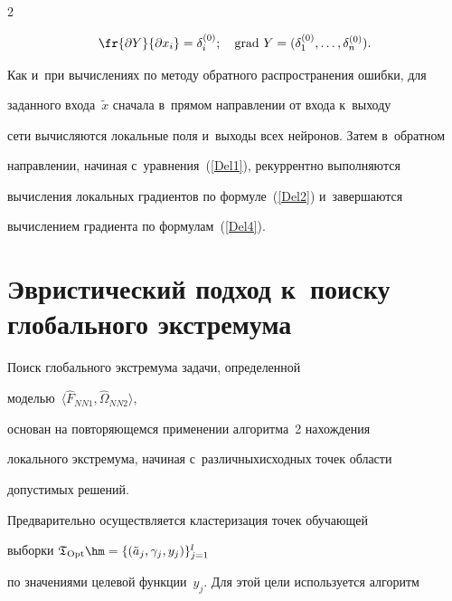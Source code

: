\begin{multicols}{2}
\noindent


\begin{equation}


\fr{\partial Y} {\partial x_i}=\delta_i^{(0)}; \quad 


\mathrm{grad} \ Y = (\delta_1^{(0)},\dots, \delta_n^{(0)}).


\label{Del4}


\end{equation}





Как и~при вычислениях по методу обратного распространения ошибки, для 


заданного входа~$\tilde{x}$ сначала в~прямом направлении от входа к~выходу 


сети вычисляются локальные поля и~выходы всех нейронов. Затем в~обратном 


направлении, начиная с~уравнения~(\ref{Del1}), рекуррентно выполняются 


вычисления локальных градиентов по формуле~(\ref{Del2}) и~завершаются 


вычислением градиента по формулам~(\ref{Del4}).











\section{Эвристический подход к~поиску глобального экстремума}





Поиск глобального экстремума  задачи, определенной 


мо\-делью~$\langle\hat{F}_{NN1}, \hat{\Omega}_{NN2}\rangle$, 


основан на повторяющемся применении  алгоритма~2 на\-хож\-де\-ния 


локального экстремума, начиная с~различных\linebreak исходных точек об\-ласти 


допустимых решений.


Предварительно осуществляется  кластеризация точек обучающей 


выборки $\mathfrak{T}_{\mathrm{Opt}}\hm=\{ (\tilde{a}_j,\gamma_j,y_j)\}_{j=1}^l$


 по значениями целевой функции~$y_j$. Для этой цели используется алгоритм



\end{multicols}
